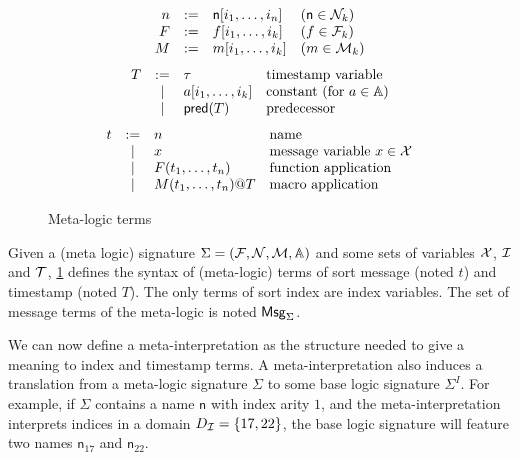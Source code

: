 \begin{figure}
\[
  \begin{array}{rcll}
    n &:=& \mathsf{n}[i_1,\ldots,i_n] & (\mathsf{n}\in\mathcal{N}_k)
    \\
    F &:=& f[i_1,\ldots,i_k] & (f\in\mathcal{F}_k)
    \\
    M &:=& m[i_1,\ldots,i_k] & (m\in\mathcal{M}_k)
  \end{array}
\]
\[
  \begin{array}{rcll}
    T &:=& \tau & \text{timestamp variable} \\
      &\mid& a[i_1,\ldots,i_k] & \text{constant (for $a\in\mathbb{A}$)} \\
      &\mid & \textsf{pred}(T) & \text{predecessor}
\end{array}
   \]
\[
     \begin{array}{rcll}
    t & := & n &\text{name} \\
    & \mid & x  & \text{message variable $x\in\mathcal{X}$} \\
    & \mid & F(t_1,\dots,t_n) &\text{function application}\\
    & \mid & M(t_1,\ldots,t_n)@T &\text{macro application}\\
       \end{array}
     \]
     \caption{Meta-logic terms}\label{fig:terms}
\end{figure}

\begin{definition}
  Given a (meta logic) signature $\Sigma = (\mathcal{F},\mathcal{N},\mathcal{M},\mathbb{A})$
  and some sets of variables
  $\mathcal{X}$, $\mathcal{I}$ and $\mathcal{T}$,
  \cref{fig:terms} defines the syntax of (meta-logic) terms
  of sort message (noted $t$) and timestamp (noted $T$).
  The only terms of sort index are index variables.
  The set of message terms of the meta-logic is noted $\mathsf{Msg}_\Sigma$.
\end{definition}

We can now define a meta-interpretation as the structure needed to
give a meaning to index and timestamp terms. A meta-interpretation
also induces a translation from a meta-logic signature $\Sigma$
to some base logic signature $\Sigma^I$. For example, if
$\Sigma$ contains a name $\mathsf{n}$ with index arity $1$, and
the meta-interpretation interprets indices in a domain $D_{\mathcal{I}} = \{
  17, 22 \}$, the base logic signature will feature
two names $\mathsf{n}_{17}$ and $\mathsf{n}_{22}$.


